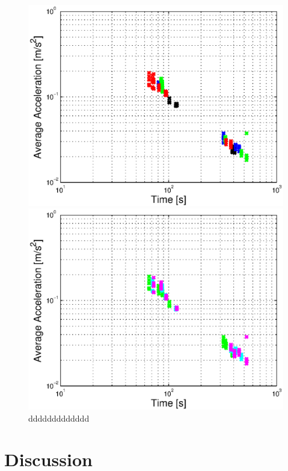 \begin{figure}[h]
  \begin{minipage}[t]{0.48\textwidth}
    \includegraphics[width = \textwidth]{correlation/Control_Correlation_Time_Acc_Parametrization}
  \end{minipage}
  \hfill
  \begin{minipage}[t]{0.48\textwidth}
    \includegraphics[width = \textwidth]{correlation/Control_Correlation_Time_Acc_SplineDegree}
  \end{minipage}
  \caption{ddddddddddddd}
  \label{fig:results_perfect_model}
\end{figure}


\section{Discussion}
\label{sec:discussion}


